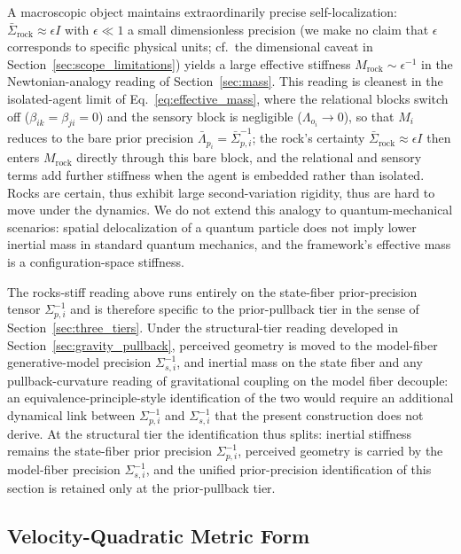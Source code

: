 \documentclass[11pt]{article}
\begin{document}
A macroscopic object maintains extraordinarily precise self-localization: $\bar{\Sigma}_{\mathrm{rock}} \approx \epsilon I$ with $\epsilon \ll 1$ a small dimensionless precision (we make no claim that $\epsilon$ corresponds to specific physical units; cf.\ the dimensional caveat in Section~\ref{sec:scope_limitations}) yields a large effective stiffness $M_{\mathrm{rock}} \sim \epsilon^{-1}$ in the Newtonian-analogy reading of Section~\ref{sec:mass}. This reading is cleanest in the isolated-agent limit of Eq.~\eqref{eq:effective_mass}, where the relational blocks switch off ($\beta_{ik} = \beta_{ji} = 0$) and the sensory block is negligible ($\Lambda_{o_i} \to 0$), so that $M_i$ reduces to the bare prior precision $\bar{\Lambda}_{p_i} = \bar{\Sigma}_{p,i}^{-1}$; the rock's certainty $\bar{\Sigma}_{\mathrm{rock}} \approx \epsilon I$ then enters $M_{\mathrm{rock}}$ directly through this bare block, and the relational and sensory terms add further stiffness when the agent is embedded rather than isolated. Rocks are certain, thus exhibit large second-variation rigidity, thus are hard to move under the dynamics. We do not extend this analogy to quantum-mechanical scenarios: spatial delocalization of a quantum particle does not imply lower inertial mass in standard quantum mechanics, and the framework's effective mass is a configuration-space stiffness.

The rocks-stiff reading above runs entirely on the state-fiber prior-precision tensor $\Sigma_{p,i}^{-1}$ and is therefore specific to the prior-pullback tier in the sense of Section~\ref{sec:three_tiers}. Under the structural-tier reading developed in Section~\ref{sec:gravity_pullback}, perceived geometry is moved to the model-fiber generative-model precision $\Sigma_{s,i}^{-1}$, and inertial mass on the state fiber and any pullback-curvature reading of gravitational coupling on the model fiber decouple: an equivalence-principle-style identification of the two would require an additional dynamical link between $\Sigma_{p,i}^{-1}$ and $\Sigma_{s,i}^{-1}$ that the present construction does not derive. At the structural tier the identification thus splits: inertial stiffness remains the state-fiber prior precision $\Sigma_{p,i}^{-1}$, perceived geometry is carried by the model-fiber precision $\Sigma_{s,i}^{-1}$, and the unified prior-precision identification of this section is retained only at the prior-pullback tier.

\subsection{Velocity-Quadratic Metric Form}
\label{sec:velocity_quadratic}
\end{document}
